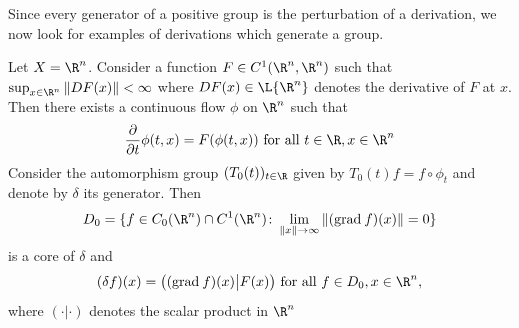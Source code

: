 Since every generator of a positive group is the perturbation of a derivation, we now look for examples of derivations which generate a group.
\begin{example}\label{ex:b2-3.15}
Let $X = \R^{n}$.
Consider a function $F \in C^{1}(\R^{n},\R^{n})$ such that $\sup_{x \in \R^{n}} \|DF(x)\| < \infty$ where $DF(x) \in \L{\R^{n}}$ denotes the derivative of\/ $F$ at $x$.
Then there exists a continuous flow $\phi$ on $\R^{n}$ such that
\begin{equation}\label{eq:b2-3.20}
\frac{\partial}{\partial t} \phi(t,x) = F(\phi(t,x)) \text{ for all } t \in \R, x \in \R^{n}
\end{equation}
Consider the automorphism group $(T_{0}(t))_{t \in \R}$ given by $T_{0}(t)f = f \circ \phi_{t}$
and denote by $\delta$ its generator.
Then 
\[D_{0} = \{ f \in C_{0}(\R^{n}) \cap C^{1}(\R^{n}) \colon \lim_{\|x\| \to \infty} \|(\mathrm{grad}\: f)(x)\| = 0 \}
\]
is a core of\/ $\delta$ and
\begin{equation}\label{eq:b2-3.21}
(\delta f)(x) = \big((\mathrm{grad}\: f)(x) \big| F(x)\big) \text{ for all } f \in D_{0}, x \in \R^{n},
\end{equation}
where $(\cdot|\cdot)$ denotes the scalar product in $\R^{n}$
\end{example}
